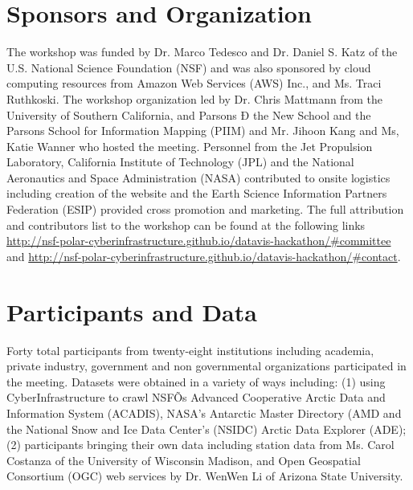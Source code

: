 \documentclass[11pt]{article}
\begin{document}
\section{Sponsors and Organization}
The workshop was funded by Dr. Marco Tedesco and Dr. Daniel S. Katz of the U.S. National Science Foundation (NSF) and was also sponsored by cloud computing resources from Amazon Web Services (AWS) Inc., and Ms. Traci Ruthkoski. The workshop organization led by Dr. Chris Mattmann from the University of Southern California, and Parsons Ð the New School and the Parsons School for Information Mapping (PIIM) and Mr. Jihoon Kang and Ms, Katie Wanner who hosted the meeting. Personnel from the Jet Propulsion Laboratory, California Institute of Technology (JPL) and the National Aeronautics and Space Administration (NASA) contributed to onsite logistics including creation of the website and the Earth Science Information Partners Federation (ESIP) provided cross promotion and marketing. The full attribution and contributors list to the workshop can be found at the following links \url{http://nsf-polar-cyberinfrastructure.github.io/datavis-hackathon/#committee} and \url{http://nsf-polar-cyberinfrastructure.github.io/datavis-hackathon/#contact}. 


\section{Participants and Data}
Forty total participants from twenty-eight institutions including academia, private industry, government and non governmental organizations participated in the meeting. Datasets were obtained in a variety of ways including: (1) using CyberInfrastructure to crawl NSFÕs Advanced Cooperative Arctic Data and Information System (ACADIS), NASA's Antarctic Master Directory (AMD and the National Snow and Ice Data Center's (NSIDC) Arctic Data Explorer (ADE);  (2) participants bringing their own data including station data from Ms. Carol Costanza of the University of Wisconsin Madison, and Open Geospatial Consortium (OGC) web services by Dr. WenWen Li of Arizona State University. 
\end{document}
